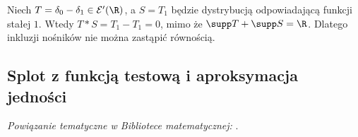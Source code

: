 \begin{przyklad}
\label{ex:support-strict21}
Niech $T=\delta_0-\delta_1\in\mathcal E'(\R)$,
a $S=T_1$ będzie dystrybucją odpowiadającą funkcji
stałej $1$. Wtedy $T*S=T_1-T_1=0$,
mimo że $\supp T+\supp S=\R$. Dlatego
inkluzji nośników nie można zastąpić równością.
\end{przyklad}

\subsection{Splot z funkcją testową i aproksymacja jedności}

\noindent\emph{Powiązanie tematyczne w Bibliotece matematycznej:} .


